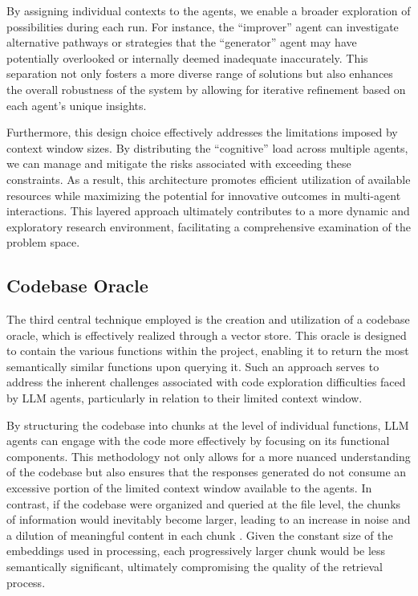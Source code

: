 \documentclass[
  a4paper,
]{scrreprt}
\theoremstyle{definition}
\theoremstyle{remark}
\begin{document}
By assigning individual contexts to the agents, we enable a broader
exploration of possibilities during each run. For instance, the
``improver'' agent can investigate alternative pathways or strategies
that the ``generator'' agent may have potentially overlooked or
internally deemed inadequate inaccurately. This separation not only
fosters a more diverse range of solutions but also enhances the overall
robustness of the system by allowing for iterative refinement based on
each agent's unique insights.

Furthermore, this design choice effectively addresses the limitations
imposed by context window sizes. By distributing the ``cognitive'' load
across multiple agents, we can manage and mitigate the risks associated
with exceeding these constraints. As a result, this architecture
promotes efficient utilization of available resources while maximizing
the potential for innovative outcomes in multi-agent interactions. This
layered approach ultimately contributes to a more dynamic and
exploratory research environment, facilitating a comprehensive
examination of the problem space.

\subsection{Codebase Oracle}\label{sec-oracle}

The third central technique employed is the creation and utilization of
a codebase oracle, which is effectively realized through a vector store.
This oracle is designed to contain the various functions within the
project, enabling it to return the most semantically similar functions
upon querying it. Such an approach serves to address the inherent
challenges associated with code exploration difficulties faced by LLM
agents, particularly in relation to their limited context window.

By structuring the codebase into chunks at the level of individual
functions, LLM agents can engage with the code more effectively by
focusing on its functional components. This methodology not only allows
for a more nuanced understanding of the codebase but also ensures that
the responses generated do not consume an excessive portion of the
limited context window available to the agents. In contrast, if the
codebase were organized and queried at the file level, the chunks of
information would inevitably become larger, leading to an increase in
noise and a dilution of meaningful content in each chunk
\autocite{zhao2024}. Given the constant size of the embeddings used in
processing, each progressively larger chunk would be less semantically
significant, ultimately compromising the quality of the retrieval
process.
\end{document}
